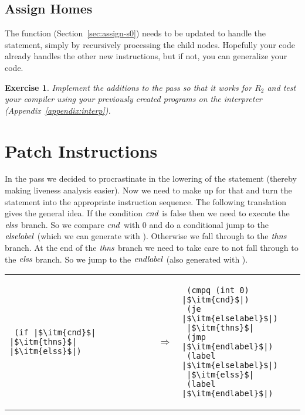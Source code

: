 \documentclass[11pt]{book}
\newtheorem{exercise}[theorem]{Exercise}
\begin{document}
\subsection{Assign Homes}
\label{sec:assign-homes-r2}

The  function (Section~\ref{sec:assign-s0}) needs
to be updated to handle the  statement, simply by recursively
processing the child nodes.  Hopefully your code already handles the
other new instructions, but if not, you can generalize your code.

\begin{exercise}\normalfont
Implement the additions to the  pass so that
it works for $R_2$ and test your compiler using your previously
created programs on the  interpreter
(Appendix~\ref{appendix:interp}).
\end{exercise}

\section{Patch Instructions}
\label{sec:patch-instructions-r2}

In the  pass we decided to procrastinate in
the lowering of the  statement (thereby making liveness
analysis easier). Now we need to make up for that and turn the
 statement into the appropriate instruction sequence.  The
following translation gives the general idea. If the condition
$\mathit{cnd}$ is false then we need to execute the $\mathit{elss}$
branch. So we compare $\mathit{cnd}$ with $0$ and do a conditional jump
to the $\mathit{elselabel}$ (which we can generate with ).
Otherwise we fall through to the $\mathit{thns}$ branch. At the end of
the $\mathit{thns}$ branch we need to take care to not fall through to
the $\mathit{elss}$ branch. So we jump to the $\mathit{endlabel}$ (also
generated with ).

\begin{tabular}{lll}
\begin{minipage}{0.3\textwidth}
\begin{lstlisting}
 (if |$\itm{cnd}$| |$\itm{thns}$| |$\itm{elss}$|)
\end{lstlisting}
\end{minipage}
&
$\Rightarrow$
&
\begin{minipage}{0.4\textwidth}
\begin{lstlisting}
 (cmpq (int 0) |$\itm{cnd}$|)
 (je |$\itm{elselabel}$|)
 |$\itm{thns}$|
 (jmp |$\itm{endlabel}$|)
 (label |$\itm{elselabel}$|)
 |$\itm{elss}$|
 (label |$\itm{endlabel}$|)
\end{lstlisting}
\end{minipage}
\end{tabular} 
\end{document}
